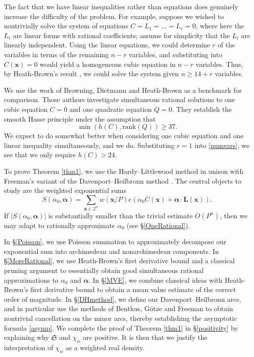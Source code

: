 \documentclass[12pt,reqno]{amsart}
\theoremstyle{definition}
\theoremstyle{remark}
\numberwithin{equation}{section}
\begin{document}
The fact that we have linear inequalities rather than equations does genuinely increase the difficulty of the problem. For example, suppose we wished to nontrivially solve the system of equations $C = L_1 = \ldots = L_r = 0$, where here the $L_i$ are linear forms with rational coefficients; assume for simplicity that the $L_i$ are linearly independent. Using the linear equations, we could determine $r$ of the variables in terms of the remaining $n-r$ variables, and substituting into $C({\mathbf x}) = 0$ would yield a homogeneous cubic equation in $n-r$ variables. Thus, by Heath-Brown's result \cite{HB2007}, we could solve the system given \mbox{$n {\geqslant} 14 + r$} variables.

We use the work of Browning, Dietmann and Heath-Brown \cite{BDHB2014} as a benchmark for comparison. Those authors investigate simultaneous rational solutions to one cubic equation $C=0$ and one quadratic equation $Q=0$. They establish the smooth Hasse principle under the assumption that
\[
\min(h(C), {\mathrm{rank}}(Q)) {\geqslant} 37.
\]
We expect to do somewhat better when considering one cubic equation and one linear inequality simultaneously, and we do. Substituting $r=1$ into \eqref{numvars}, we see that we only require $h(C) > 24$.

To prove Theorem \ref{thm1}, we use the Hardy--Littlewood method \cite{Vau1997} in unison with Freeman's variant \cite{Fre2002} of the Davenport--Heilbronn method \cite{DH1946}. The central objects to study are the weighted exponential sums
\[
S({{\alpha}}_0, {\boldsymbol{{\alpha}}}) = \sum_{{\mathbf x} \in {\mathbb Z}^n} w({\mathbf x} / P) e({{\alpha}}_0 C({\mathbf x}) + {\boldsymbol{{\alpha}}} \cdot {\mathbf L}({\mathbf x})).
\]
If $|S({{\alpha}}_0, {\boldsymbol{{\alpha}}})|$ is substantially smaller than the trivial estimate $O(P^n)$, then we may adapt \cite[Lemma 4]{DL1964} to rationally approximate ${{\alpha}}_0$ (see \S \ref{OneRational}). 

In \S \ref{Poisson}, we use Poisson summation to approximately decompose our exponential sum into archimedean and nonarchimedean components. In \S \ref{MoreRational}, we use Heath-Brown's first derivative bound \cite[Lemma 10]{HB1996} and a classical pruning argument \cite[Lemma 15.1]{Dav2005} to essentially obtain good simultaneous rational approximations to ${{\alpha}}_0$ and ${\boldsymbol{{\alpha}}}$. In \S \ref{MVE}, we combine classical ideas with Heath-Brown's first derivative bound to obtain a mean value estimate of the correct order of magnitude. In \S \ref{DHmethod}, we define our Davenport--Heilbronn arcs, and in particular use the methods of Bentkus, G\"otze and Freeman \cite{BG1999,Fre2002,Woo2003} to obtain nontrivial cancellation on the minor arcs, thereby establishing the asymptotic formula \eqref{asymp}. We complete the proof of Theorem \ref{thm1} in \S \ref{positivity} by explaining why ${\mathfrak S}$ and $\chi_w$ are positive. It is then that we justify the interpretation of $\chi_w$ as a weighted real density.
\end{document}
